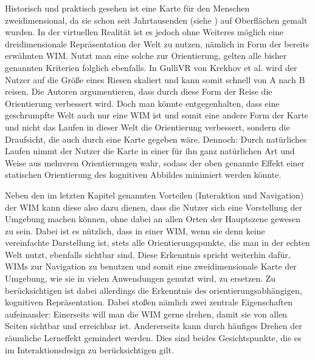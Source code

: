 Historisch und praktisch gesehen ist eine Karte für den Menschen zweidimensional, da sie schon seit Jahrtausenden (siehe \cite{meece_2006}) auf Oberflächen gemalt wurden. 
In der virtuellen Realität ist es jedoch ohne Weiteres möglich eine dreidimensionale Repräsentation der Welt zu nutzen, nämlich in Form der bereits erwähnten WIM.
Nutzt man eine solche zur Orientierung, gelten alle bisher genannten Kriterien folglich ebenfalls.
In GulliVR von Krekhov et al. \cite{Krekhov2018GulliVR} wird der Nutzer auf die Größe eines Riesen skaliert und kann somit schnell von A nach B reisen. Die Autoren argumentieren, dass durch diese Form der Reise die Orientierung verbessert wird. Doch man könnte entgegenhalten, dass eine geschrumpfte Welt auch nur eine WIM ist und somit eine andere Form der Karte und nicht das Laufen in dieser Welt die Orientierung verbessert, sondern die Draufsicht, die auch durch eine Karte gegeben wäre.
Dennoch: Durch natürliches Laufen nimmt der Nutzer die \glqq Karte\grqq{} in einer für ihn ganz natürlichen Art und Weise aus mehreren Orientierungen wahr, sodass der oben genannte Effekt einer statischen Orientierung des kognitiven Abbildes minimiert werden könnte.

Neben den im letzten Kapitel genannten Vorteilen (Interaktion und Navigation) der WIM kann diese also dazu dienen, dass die Nutzer sich eine Vorstellung der Umgebung machen können, ohne dabei an allen Orten der Hauptszene gewesen zu sein. Dabei ist es nützlich, dass in einer WIM, wenn sie denn keine vereinfachte Darstellung ist, stets alle Orientierungspunkte, die man in der echten Welt nutzt, ebenfalls sichtbar sind.
Diese Erkenntnis spricht weiterhin dafür, WIMs zur Navigation zu benutzen und somit eine zweidimensionale Karte der Umgebung, wie sie in vielen Anwendungen genutzt wird, zu ersetzen.
Zu berücksichtigen ist dabei allerdings die Erkenntnis des orientierungsabhängigen, kognitiven Repräsentation. Dabei stoßen nämlich zwei zentrale Eigenschaften aufeinander: Einerseits will man die WIM gerne drehen, damit sie von allen Seiten sichtbar und erreichbar ist. Andererseits kann durch häufiges Drehen der räumliche Lerneffekt gemindert werden. Dies sind beides Gesichtspunkte, die es im Interaktionsdesign zu berücksichtigen gilt.
